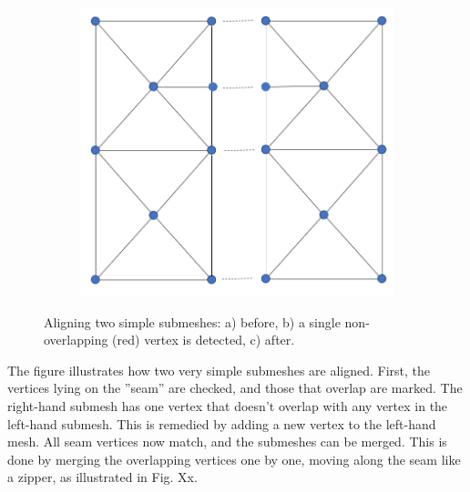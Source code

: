 \documentclass{article}
\begin{document}
\begin{figure}[H]
\begin{subfigure}[b]{0.3\linewidth}
    \caption{}
  \end{subfigure}
  \begin{subfigure}[b]{0.3\linewidth}
    \includegraphics[width=\linewidth]{Fig_mesh_align_03.png}
    \caption{}
  \end{subfigure}
  \caption{Aligning two simple submeshes: a) before, b) a single non-overlapping (red) vertex is detected, c) after.}
\end{figure}

The figure illustrates how two very simple submeshes are aligned. First, the vertices lying on the ''seam'' are checked, and those that overlap are marked. The right-hand submesh has one vertex that doesn't overlap with any vertex in the left-hand submesh. This is remedied by adding a new vertex to the left-hand mesh. All seam vertices now match, and the submeshes can be merged. This is done by merging the overlapping vertices one by one, moving along the seam like a zipper, as illustrated in Fig. Xx.
\end{document}
